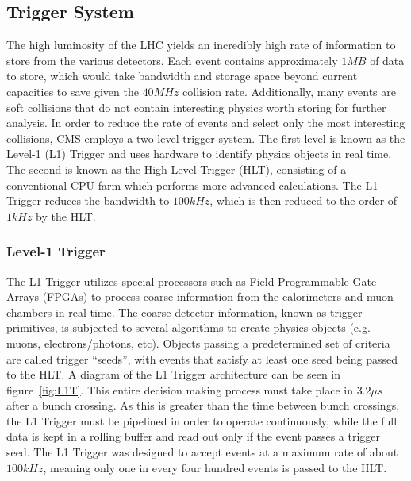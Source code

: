 \subsection{Trigger System} \label{sec:CMS_trig}
The high luminosity of the LHC yields an incredibly high rate of information to store from the various detectors. Each event contains approximately $1\unit{MB}$ of data to store, which would take bandwidth and storage space beyond current capacities to save given the $40\unit{MHz}$ collision rate. Additionally, many events are soft collisions that do not contain interesting physics worth storing for further analysis. In order to reduce the rate of events and select only the most interesting collisions, CMS employs a two level trigger system. The first level is known as the Level-1 (L1) Trigger and uses hardware to identify physics objects in real time. The second is known as the High-Level Trigger (HLT), consisting of a conventional CPU farm which performs more advanced calculations. The L1 Trigger reduces the bandwidth to $100\unit{kHz}$, which is then reduced to the order of $1\unit{kHz}$ by the HLT.

\subsubsection{Level-1 Trigger} \label{sec:CMS_L1T}
The L1 Trigger utilizes special processors such as Field Programmable Gate Arrays (FPGAs) to process coarse information from the calorimeters and muon chambers in real time. The coarse detector information, known as trigger primitives, is subjected to several algorithms to create physics objects (e.g. muons, electrons/photons, etc). Objects passing a predetermined set of criteria are called trigger ``seeds'', with events that satisfy at least one seed being passed to the HLT. A diagram of the L1 Trigger architecture can be seen in figure~\ref{fig:L1T}. This entire decision making process must take place in $3.2\unit{\mu s}$ after a bunch crossing. As this is greater than the time between bunch crossings, the L1 Trigger must be pipelined in order to operate continuously, while the full data is kept in a rolling buffer and read out only if the event passes a trigger seed. The L1 Trigger was designed to accept events at a maximum rate of about $100\unit{kHz}$, meaning only one in every four hundred events is passed to the HLT.

